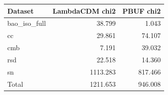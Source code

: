 \begin{tabular}{lrr}
\toprule
Dataset & LambdaCDM chi2 & PBUF chi2 \\
\midrule
bao\_iso\_full & 38.799 & 1.043 \\
cc & 29.861 & 74.107 \\
cmb & 7.191 & 39.032 \\
rsd & 22.518 & 14.360 \\
sn & 1113.283 & 817.466 \\
\midrule
Total & 1211.653 & 946.008 \\
\bottomrule
\end{tabular}
